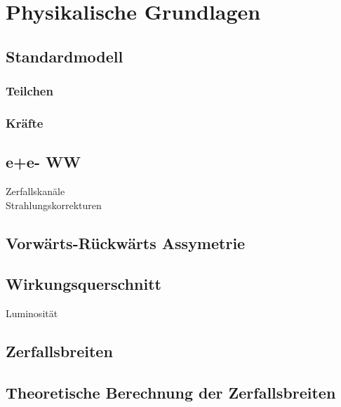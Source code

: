 \section{Physikalische Grundlagen}
\subsection{Standardmodell}
\subsubsection{Teilchen}
\subsubsection{Kräfte}
\subsection{e+e- WW}
Zerfallskanäle \\
Strahlungskorrekturen
\subsection{Vorwärts-Rückwärts Assymetrie}
\subsection{Wirkungsquerschnitt}
Luminosität
\subsection{Zerfallsbreiten}
\subsection{Theoretische Berechnung der Zerfallsbreiten}